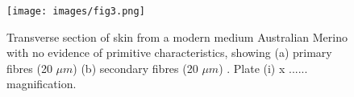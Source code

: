 %

\begin{figure}[tbp]
  \centering
  \texttt{[image: images/fig3.png]}
  \caption{Transverse section of skin from a modern medium Australian Merino
        with no evidence of primitive characteristics, showing (a)
        primary fibres (20 $\mu m$) (b) secondary fibres (20 $\mu m$) .
        Plate (i) x ...... magnification.}
  \label{fig:3}
\end{figure}

%
